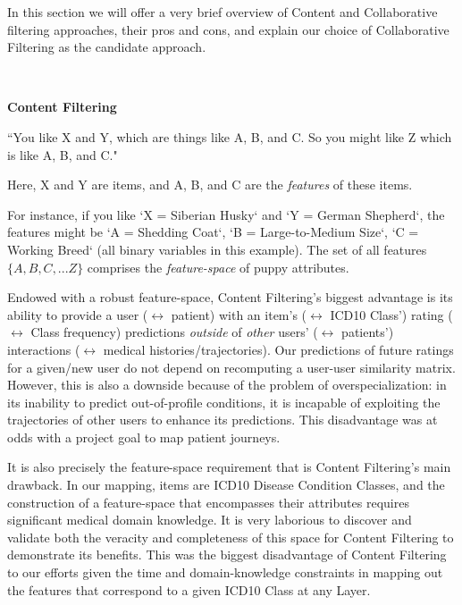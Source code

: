 \documentclass[twoside,11pt]{article}
\begin{document}
In this section we will offer a very brief overview of Content and Collaborative filtering approaches, their pros and cons, and explain our choice of Collaborative Filtering as the candidate approach.

\

\textbf{Content Filtering}

\vspace{2em}

\centerline{``You like X and Y, which are things like A, B, and C.
So you might like Z which is like A, B, and C."}

\vspace{1em}

Here, X and Y are items, and A, B, and C are the \textit{features} of these items.

For instance, if you like `X = Siberian Husky` and `Y = German Shepherd`, the features might be `A = Shedding Coat`, `B = Large-to-Medium Size`, `C = Working Breed` (all binary variables in this example). The set of all features $\{A, B, C,...Z\}$ comprises the \textit{feature-space} of puppy attributes.

Endowed with a robust feature-space, Content Filtering's biggest advantage is its ability to provide a user ($\leftrightarrow$ patient) with an item's ($\leftrightarrow$ ICD10 Class') rating ($\leftrightarrow$ Class frequency) predictions \textit{outside} of \textit{other} users' ($\leftrightarrow$ patients') interactions ($\leftrightarrow$ medical histories/trajectories). Our predictions of future ratings for a given/new user do not depend on recomputing a user-user similarity matrix. However, this is also a downside because of the problem of overspecialization: in its inability to predict out-of-profile conditions, it is incapable of exploiting the trajectories of other users to enhance its predictions. This disadvantage was at odds with a project goal to map patient journeys.

It is also precisely the feature-space requirement that is Content Filtering's main drawback. In our mapping, items are ICD10 Disease Condition Classes, and the construction of a feature-space that encompasses their attributes requires significant medical domain knowledge. It is very laborious to discover and validate both the veracity and completeness of this space for Content Filtering to demonstrate its benefits. This was the biggest disadvantage of Content Filtering to our efforts given the time and domain-knowledge constraints in mapping out the features that correspond to a given ICD10 Class at any Layer.
\end{document}

